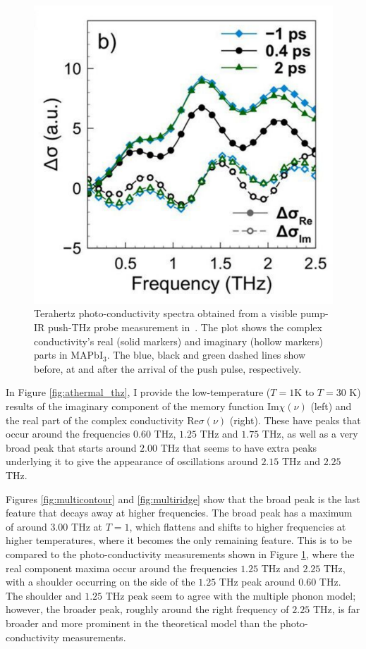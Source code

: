 \begin{figure}[t]  
    \centering
    \includegraphics[width=.7\textwidth]{figures/thz_plot.pdf}
    
    \caption{Terahertz photo-conductivity spectra obtained from a visible pump-IR push-THz probe measurement in~\cite{zheng_multipulse_2021}. The plot shows the complex conductivity's real (solid markers) and imaginary (hollow markers) parts in MAPbI$_3$. The blue, black and green dashed lines show before, at and after the arrival of the push pulse, respectively.}
    \label{fig:thzplot}
\end{figure}

In Figure \ref{fig:athermal_thz}, I provide the low-temperature ($T = 1$K to $T = 30$ K) results of the imaginary component of the memory function $\text{Im}\chi(\nu)$ (left) and the real part of the complex conductivity $\text{Re}\sigma(\nu)$ (right). These have peaks that occur around the frequencies $0.60$ THz, $1.25$ THz and $1.75$ THz, as well as a very broad peak that starts around $2.00$ THz that seems to have extra peaks underlying it to give the appearance of oscillations around $2.15$ THz and $2.25$ THz. 

Figures \ref{fig:multicontour} and \ref{fig:multiridge} show that the broad peak is the last feature that decays away at higher frequencies. The broad peak has a maximum of around $3.00$ THz at $T = 1$, which flattens and shifts to higher frequencies at higher temperatures, where it becomes the only remaining feature. This is to be compared to the photo-conductivity measurements shown in Figure \ref{fig:thzplot}, where the real component maxima occur around the frequencies $1.25$ THz and $2.25$ THz, with a shoulder occurring on the side of the $1.25$ THz peak around $0.60$ THz. The shoulder and $1.25$ THz peak seem to agree with the multiple phonon model; however, the broader peak, roughly around the right frequency of $2.25$ THz, is far broader and more prominent in the theoretical model than the photo-conductivity measurements. 

